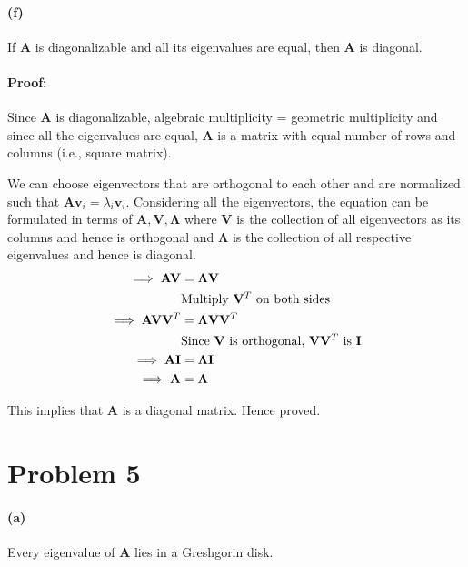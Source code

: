 \documentclass[12pt, letterpaper]{article}
\begin{document}
\paragraph{(f)} If $\mathbf{A}$ is diagonalizable and all its eigenvalues are equal, then $\mathbf{A}$ is diagonal.

\paragraph{Proof:}

Since $\mathbf{A}$ is diagonalizable, algebraic multiplicity = geometric multiplicity and since all the eigenvalues are equal, $\mathbf{A}$ is a matrix with equal number of rows and columns (i.e., square matrix).

We can choose eigenvectors that are orthogonal to each other and are normalized such that $\mathbf{A}\mathbf{v}_i = \lambda_i \mathbf{v}_i$. Considering all the eigenvectors, the equation can be formulated in terms of $\mathbf{A}, \mathbf{V}, \mathbf{\Lambda}$ where $\mathbf{V}$ is the collection of all eigenvectors as its columns and hence is orthogonal and $\mathbf{\Lambda}$ is the collection of all respective eigenvalues and hence is diagonal.
\begin{align*}
  \implies \mathbf{A}\mathbf{V} &= \mathbf{\Lambda} \mathbf{V} \\
  &\text{Multiply $\mathbf{V}^T$ on both sides} \\
  \implies \mathbf{A}\mathbf{V}\mathbf{V}^T &= \mathbf{\Lambda} \mathbf{V}\mathbf{V}^T \\
  &\text{Since \textbf{V} is orthogonal, $\mathbf{V}\mathbf{V}^T$ is \textbf{I}} \\
  \implies \mathbf{A}\mathbf{I} &= \mathbf{\Lambda} \mathbf{I} \\
  \implies \mathbf{A} &= \mathbf{\Lambda} \\
\end{align*}

This implies that $\mathbf{A}$ is a diagonal matrix. Hence proved.

\pagebreak
\section*{Problem 5}
\label{sec:prob5}

\paragraph{(a)} Every eigenvalue of $\mathbf{A}$ lies in a Greshgorin disk.
\end{document}
